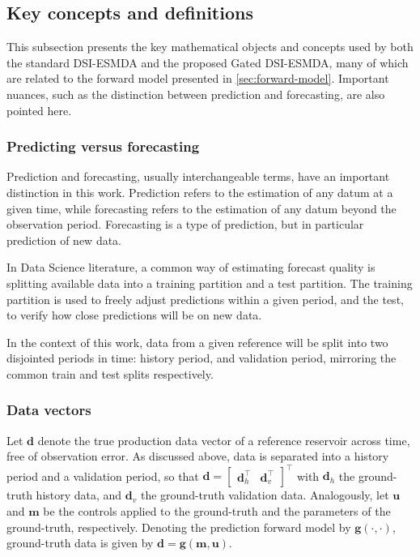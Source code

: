 \subsection{Key concepts and definitions}
This subsection presents the key mathematical objects and concepts 
used by both the standard DSI-ESMDA and the proposed Gated DSI-ESMDA,
many of which are related to the forward model 
presented in \cref{sec:forward-model}.
%
Important nuances, such as the distinction between prediction and forecasting,
are also pointed here.

\subsubsection{Predicting versus forecasting}
Prediction and forecasting, usually interchangeable terms, 
have an important distinction in this work.
%
Prediction refers to the estimation of any datum at a given time,
while forecasting refers to the estimation of any datum beyond the observation period.
%
Forecasting is a type of prediction, but in particular prediction of new data.

In Data Science literature, 
a common way of estimating forecast quality is splitting available data 
into a training partition and a test partition.
%
The training partition is used to freely adjust predictions within a given period, 
and the test, to verify how close predictions will be on new data.

In the context of this work, data from a given reference will be split into two disjointed periods in time:
history period, and validation period,
mirroring the common train and test splits respectively.

\subsubsection{Data vectors}
Let $\mathbf{d}$ denote the true production data vector of a reference reservoir across time,
free of observation error.
As discussed above, data is separated into a history period and a validation period,
so that $\mathbf{d} = \begin{bmatrix}
    \mathbf{d}^\top_h & \mathbf{d}^\top_v
\end{bmatrix}^\top$
with $\mathbf{d}_h$ the ground-truth history data, and $\mathbf{d}_v$ the ground-truth validation data.
%
Analogously, let $\mathbf{u}$ and $\mathbf{m}$ be 
the controls applied to the ground-truth and the parameters of the ground-truth, respectively.
%
Denoting the prediction forward model by $\mathbf{g}(\cdot, \cdot)$,
ground-truth data is given by $\mathbf{d} = \mathbf{g}(\mathbf{m}, \mathbf{u})$.

